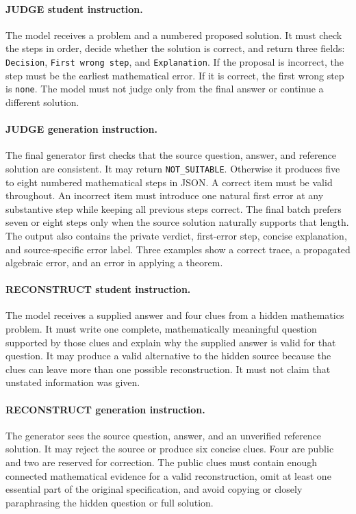 \documentclass[11pt]{article}
\begin{document}
\paragraph{JUDGE student instruction.}
The model receives a problem and a numbered proposed solution. It must check the steps in order, decide whether the solution is correct, and return three fields: \texttt{Decision}, \texttt{First wrong step}, and \texttt{Explanation}. If the proposal is incorrect, the step must be the earliest mathematical error. If it is correct, the first wrong step is \texttt{none}. The model must not judge only from the final answer or continue a different solution.

\paragraph{JUDGE generation instruction.}
The final generator first checks that the source question, answer, and reference solution are consistent. It may return \texttt{NOT\_SUITABLE}. Otherwise it produces five to eight numbered mathematical steps in JSON. A correct item must be valid throughout. An incorrect item must introduce one natural first error at any substantive step while keeping all previous steps correct. The final batch prefers seven or eight steps only when the source solution naturally supports that length. The output also contains the private verdict, first-error step, concise explanation, and source-specific error label. Three examples show a correct trace, a propagated algebraic error, and an error in applying a theorem.

\paragraph{RECONSTRUCT student instruction.}
The model receives a supplied answer and four clues from a hidden mathematics problem. It must write one complete, mathematically meaningful question supported by those clues and explain why the supplied answer is valid for that question. It may produce a valid alternative to the hidden source because the clues can leave more than one possible reconstruction. It must not claim that unstated information was given.

\paragraph{RECONSTRUCT generation instruction.}
The generator sees the source question, answer, and an unverified reference solution. It may reject the source or produce six concise clues. Four are public and two are reserved for correction. The public clues must contain enough connected mathematical evidence for a valid reconstruction, omit at least one essential part of the original specification, and avoid copying or closely paraphrasing the hidden question or full solution.
\end{document}
